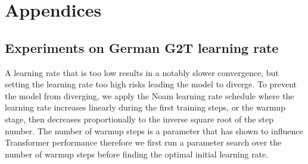 \documentclass[11pt]{article}
\begin{document}


\clearpage


\appendix
\section{Appendices}


\subsection{Experiments on German G2T learning rate}
\label{sec:lr}

A learning rate that is too low results in a notably slower convergence, but setting the learning rate too high risks leading the model to diverge. To prevent the model from diverging, we apply the Noam learning rate schedule where the learning rate increases linearly during the first training steps, or the warmup stage, then decreases proportionally to the inverse square root of the step number. The number of warmup steps is a parameter that has shown to influence Transformer performance \cite{transformertips} therefore we first run a parameter search over the number of warmup steps before finding the optimal initial learning rate.
\end{document}
